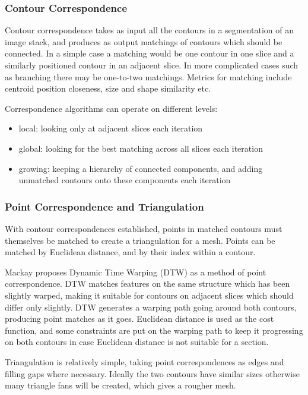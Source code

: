 \documentclass[10pt]{article}
\begin{document}
\subsubsection{Contour Correspondence}

Contour correspondence takes as input all the contours in a segmentation of an image stack, and produces as output matchings of contours which should be connected. In a simple case a matching would be one contour in one slice and a similarly positioned contour in an adjacent slice. In more complicated cases such as branching there may be one-to-two matchings. Metrics for matching include centroid position closeness, size and shape similarity etc.

Correspondence algorithms can operate on different levels:
\begin{itemize}
\item local: looking only at adjacent slices each iteration
\item global: looking for the best matching across all slices each iteration
\item growing: keeping a hierarchy of connected components, and adding unmatched contours onto these components each iteration
\end{itemize}

\subsubsection{Point Correspondence and Triangulation}

With contour correspondences established, points in matched contours must themselves be matched to create a triangulation for a mesh. Points can be matched by Euclidean distance, and by their index within a contour. 

Mackay \cite{mackay2019robust} proposes Dynamic Time Warping (DTW) as a method of point correspondence. DTW matches features on the same structure which has been slightly warped, making it suitable for contours on adjacent slices which should differ only slightly. DTW generates a warping path going around both contours, producing point matches as it goes. Euclidean distance is used as the cost function, and some constraints are put on the warping path to keep it progressing on both contours in case Euclidean distance is not suitable for a section.

Triangulation is relatively simple, taking point correspondences as edges and filling gaps where necessary. Ideally the two contours have similar sizes otherwise many triangle fans will be created, which gives a rougher mesh.
\end{document}
